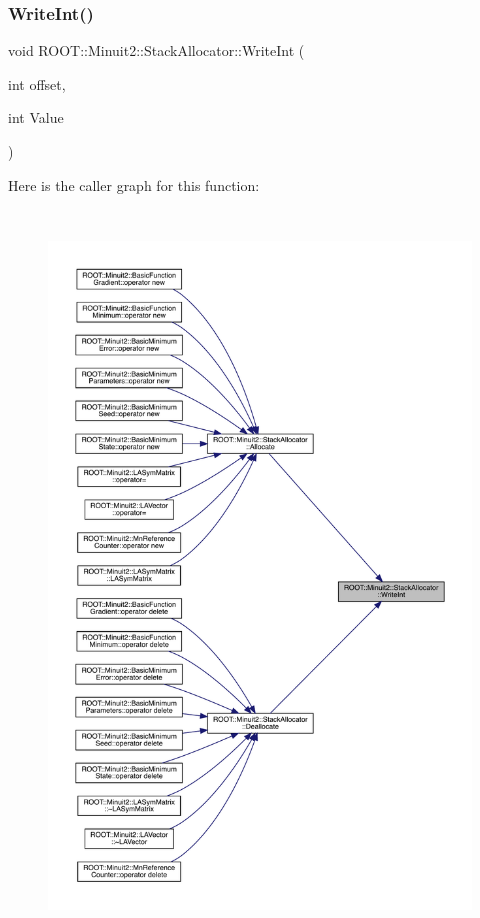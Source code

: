 \subsubsection{\texorpdfstring{WriteInt()}{WriteInt()}\hspace{0.1cm}{\footnotesize\ttfamily [2/3]}}
{\footnotesize\ttfamily void R\+O\+O\+T\+::\+Minuit2\+::\+Stack\+Allocator\+::\+Write\+Int (\begin{DoxyParamCaption}\item[{int}]{offset,  }\item[{int}]{Value }\end{DoxyParamCaption})\hspace{0.3cm}{\ttfamily [inline]}}

Here is the caller graph for this function\+:
\nopagebreak
\begin{figure}[H]
\begin{center}
\leavevmode
\includegraphics[height=550pt]{d3/d1e/classROOT_1_1Minuit2_1_1StackAllocator_a1f87ef34658b74aa3fff9abd1cd1094e_icgraph}
\end{center}
\end{figure}
\mbox{\label{classROOT_1_1Minuit2_1_1StackAllocator_a1f87ef34658b74aa3fff9abd1cd1094e}} 

